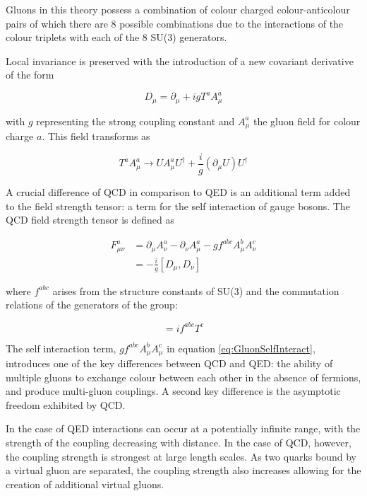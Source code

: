 \documentclass[12pt,a4paper,epsf,portrait,times,epsfig]{report}
\begin{document}
	Gluons in this theory possess a combination of colour charged colour-anticolour pairs of which there are 8 possible combinations due to the interactions of the colour triplets with each of the 8 SU(3) generators. \par 

	Local invariance is preserved with the introduction of a new covariant derivative of the form

	\begin{equation}
		D_{\mu} = \partial_{\mu} + igT^{a}A_{\mu}^{a}
	\end{equation}

	with $g$ representing the strong coupling constant and $A_{\mu}^{a}$ the gluon field for colour charge $a$. This field transforms as

	\begin{equation}
		T^{a}A_{\mu}^{a} \rightarrow UA_{\mu}^{a}U^{\dagger}+\frac{i}{g}(\partial_{\mu}U)U^{\dagger}
	\end{equation}

	A crucial difference of QCD in comparison to QED is an additional term added to the field strength tensor: a term for the self interaction of gauge bosons. The QCD field strength tensor is defined as

	\begin{equation} \label{eq:GluonSelfInteract}
		\begin{split}
		F_{\mu\nu}^{a}&=\partial_{\mu}A_{\nu}^{a}-\partial_{\nu}A_{\mu}^{a}-gf^{abc}A_{\mu}^{b}A_{\nu}^{c} \\
		&=-\frac{i}{g}[D_{\mu},D_{\nu}]
		\end{split}
	\end{equation} 

	where $f^{abc}$ arises from the structure constants of SU(3) and the commutation relations of the generators of the group:

	\begin{equation}
		[T^{a},T^{b}] = if^{abc}T^{c}
	\end{equation}

	The self interaction term, $gf^{abc}A_{\mu}^{b}A_{\mu}^{c}$ in equation \ref{eq:GluonSelfInteract}, introduces one of the key differences between QCD and QED: the ability of multiple gluons to exchange colour between each other in the absence of fermions, and produce multi-gluon couplings. A second key difference is the asymptotic freedom exhibited by QCD. \par 
	
	In the case of QED interactions can occur at a potentially infinite range, with the strength of the coupling decreasing with distance. In the case of QCD, however, the coupling strength is strongest at large length scales. As two quarks bound by a virtual gluon are separated, the coupling strength also increases allowing for the creation of additional virtual gluons. \par
	
\end{document}
